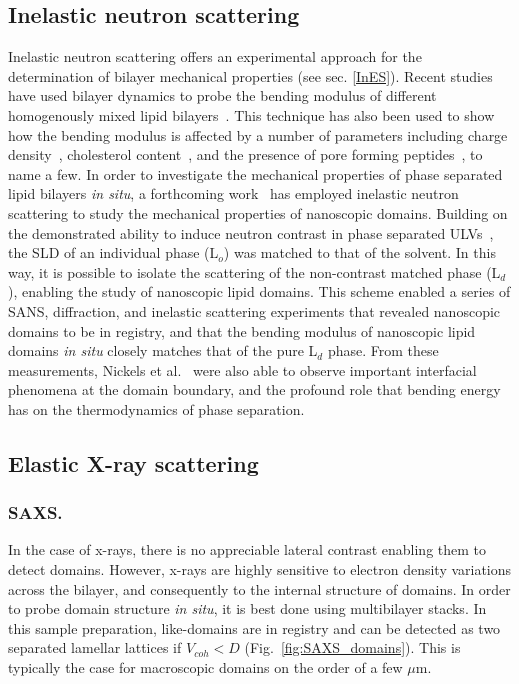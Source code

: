 \documentclass[8.5pt,twoside,twocolumn]{article}
\begin{document}
\subsection{Inelastic neutron scattering}
Inelastic neutron scattering offers an experimental approach for the determination of bilayer mechanical properties (see sec. \ref{InES}). Recent studies have used bilayer dynamics to probe the bending modulus of different homogenously mixed lipid bilayers~\cite{Woodka.2012,Pan.2015,Yi.2009}. This technique has also been used to show how the bending modulus is affected by a number of parameters including charge density~\cite{Bruning.2013}, cholesterol content~\cite{Arriaga.2010}, and the presence of pore forming peptides~\cite{Lee.2010}, to name a few. In order to investigate the mechanical properties of phase separated lipid bilayers \textit{in situ}, a forthcoming work~\cite{Nickels.2015b} has employed inelastic neutron scattering to study the mechanical properties of nanoscopic domains. Building on the demonstrated ability to induce neutron contrast in phase separated ULVs~\cite{Heberle.2013}, the SLD of an individual phase (L$_o$) was matched to that of the solvent. In this way, it is possible to isolate the scattering of the non-contrast matched phase (L$_d$), enabling the study of nanoscopic lipid domains. This scheme enabled a series of SANS, diffraction, and inelastic scattering experiments that revealed nanoscopic domains to be in registry, and that the bending modulus of nanoscopic lipid domains \textit{in situ} closely matches that of the pure L$_d$ phase. From these measurements, Nickels et al.~\cite{Nickels.2015b} were also able to observe important interfacial phenomena at the domain boundary, and the profound role that  bending energy has on the thermodynamics of phase separation. 


\subsection{Elastic X-ray scattering}
\label{sec:elatic_xray}
\subsubsection{SAXS. }
In the case of x-rays, there is no appreciable lateral contrast enabling them to detect domains. However, x-rays are highly sensitive to electron density variations across the bilayer, and consequently to the internal structure of domains. In order to probe domain structure \textit{in situ}, it is best done using multibilayer stacks. In this sample preparation, like-domains are in registry and can be detected as two separated lamellar lattices if $V_{coh} < D$ (Fig.~\ref{fig:SAXS_domains}). This is typically the case for macroscopic domains on the order of a few $\mu$m.
\end{document}
